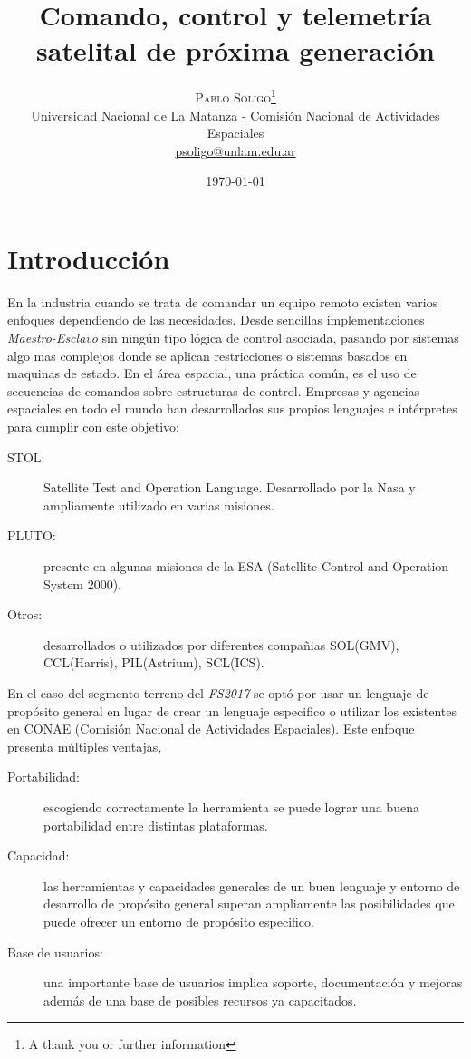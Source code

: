 \documentclass[twoside,twocolumn]{article}
\title{Comando, control y telemetría satelital de próxima generación} %
\author{%
\textsc{Pablo Soligo}\thanks{A thank you or further information} \\[1ex] %
\normalsize Universidad Nacional de La Matanza - Comisión Nacional de Actividades Espaciales \\ %
\normalsize \href{mailto:psoligo@unlam.edu.ar}{psoligo@unlam.edu.ar} %
}
\date{\today} %
\begin{document}
\maketitle


\section{Introducción}

En la industria cuando se trata de comandar un equipo remoto existen varios 
enfoques dependiendo de las necesidades. Desde sencillas implementaciones 
\textit{Maestro-Esclavo} sin ningún tipo lógica de control asociada, pasando 
por sistemas algo mas complejos donde se aplican restricciones o sistemas 
basados en maquinas de estado. En el área espacial, una práctica común, es el uso 
de secuencias de comandos sobre estructuras de control. Empresas y agencias 
espaciales en todo el mundo han desarrollados sus propios lenguajes e 
intérpretes para cumplir con este objetivo: 

\begin{description}
 \item [STOL:] Satellite Test and Operation Language. Desarrollado por la Nasa y ampliamente utilizado en varias misiones. 
 \item [PLUTO:] presente en algunas misiones de la ESA (Satellite Control and Operation System 2000).
 \item [Otros:] desarrollados o utilizados por diferentes compañias  SOL(GMV), CCL(Harris), PIL(Astrium), SCL(ICS). 
\end{description}

En el caso del segmento terreno del \textit{FS2017} se optó por usar un lenguaje 
de propósito general en lugar de crear un lenguaje especifico
o utilizar los existentes en CONAE (Comisión Nacional de Actividades Espaciales). Este enfoque presenta múltiples ventajas,

\begin{description}
 \item [Portabilidad: ] escogiendo correctamente la herramienta se puede lograr una buena portabilidad entre distintas plataformas.
 \item [Capacidad: ] las herramientas y capacidades generales de un buen lenguaje y entorno de desarrollo de propósito general superan ampliamente las posibilidades que puede ofrecer un entorno de propósito especifico.
 \item [Base de usuarios: ] una importante base de usuarios implica soporte, documentación y mejoras además de una base de posibles recursos ya capacitados. 
\end{description}
\end{document}
